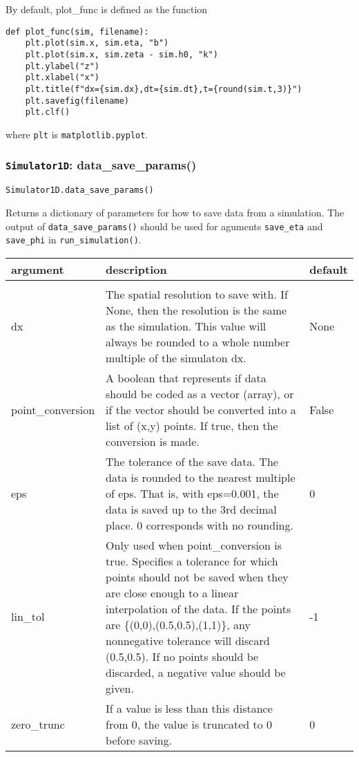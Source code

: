 \documentclass[10pt,a4paper]{article}
\newenvironment{optarglist}
    {\begin{center}
    \begin{tabular}{l|p{10cm}|l}
    argument & description & default\\
    \hline\\
    }
    { 
    \end{tabular} 
    \end{center}
    }
\begin{document}
By default, plot\_func is defined as the function

\begin{verbatim}
def plot_func(sim, filename):
    plt.plot(sim.x, sim.eta, "b")
    plt.plot(sim.x, sim.zeta - sim.h0, "k")
    plt.ylabel("z")
    plt.xlabel("x")
    plt.title(f"dx={sim.dx},dt={sim.dt},t={round(sim.t,3)}")
    plt.savefig(filename)
    plt.clf()
\end{verbatim}

where \texttt{plt} is \texttt{matplotlib.pyplot}.



\subsubsection{\texttt{Simulator1D}: data\_save\_params()}
\texttt{Simulator1D.data\_save\_params()}

Returns a dictionary of parameters for how to save data from a simulation. The output of \texttt{data\_save\_params()} should be used for aguments \texttt{save\_eta} and \texttt{save\_phi} in \texttt{run\_simulation()}.

\begin{optarglist}
        dx    
              & The spatial resolution to save with. If None, then the
                resolution is the same as the simulation. This value
                will always be rounded to a whole number multiple of
                the simulaton dx. & None \\\hline

        point\_conversion
              & A boolean that represents if data should be coded as
                a vector (array), or if the vector should be converted
                into a list of (x,y) points. If true, then the conversion
                is made. & False \\\hline

        eps
              & The tolerance of the save data. The data is rounded to the 
                nearest multiple of eps. That is, with eps=0.001, the data
                is saved up to the 3rd decimal place. 0 corresponds with
                no rounding. & 0\\\hline
        
        lin\_tol
             & Only used when point\_conversion is true. Specifies a tolerance
                for which points should not be saved when they are close enough
                to a linear interpolation of the data. If the points are 
                \{(0,0),(0.5,0.5),(1,1)\}, any nonnegative tolerance will discard
                (0.5,0.5). If no points should be discarded, a negative value
                should be given. & -1\\\hline
        
        zero\_trunc
              & If a value is less than this distance from 0, the value is 
                truncated to 0 before saving.& 0
\end{optarglist}
\end{document}
